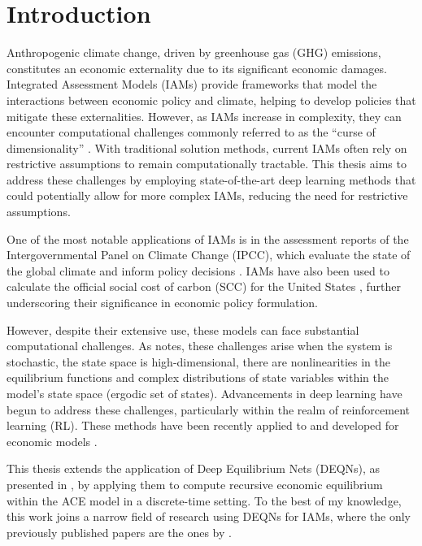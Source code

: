 \section{Introduction}

Anthropogenic climate change, driven by greenhouse gas (GHG) emissions, constitutes an economic externality due to its significant economic damages.
Integrated Assessment Models (IAMs) provide frameworks that model the interactions between economic policy and climate, helping to develop policies that mitigate these externalities. However, as IAMs increase in complexity, they can encounter computational challenges commonly referred to as the \enquote{curse of dimensionality} \parencite{Bellman1961}. With traditional solution methods, current IAMs often rely on restrictive assumptions to remain computationally tractable. This thesis aims to address these challenges by employing state-of-the-art deep learning methods that could potentially allow for more complex IAMs, reducing the need for restrictive assumptions.

One of the most notable applications of IAMs is in the assessment reports of the Intergovernmental Panel on Climate Change (IPCC), which evaluate the state of the global climate and inform policy decisions \parencite{IPCC2023}. IAMs have also been used to calculate the official social cost of carbon (SCC) for the United States \parencite{IWGSCC2013}, further underscoring their significance in economic policy formulation. 

However, despite their extensive use, these models can face substantial computational challenges. As \textcite{Azinovic2022DEQN} notes, these challenges arise when the system is stochastic, the state space is high-dimensional, there are nonlinearities in the equilibrium functions and complex distributions of state variables within the model's state space (ergodic set of states). Advancements in deep learning have begun to address these challenges, particularly within the realm of reinforcement learning (RL). These methods have been recently applied to and developed for economic models \parencite{Maliar2021, Azinovic2022DEQN, Valaitis2024}.

This thesis extends the application of Deep Equilibrium Nets (DEQNs), as presented in \textcite{Azinovic2022DEQN}, by applying them to compute recursive economic equilibrium within the ACE model in a discrete-time setting. To the best of my knowledge, this work joins a narrow field of research using DEQNs for IAMs, where the only previously published papers are the ones by \textcite{Folini2024ClimateInCE, friedl2023_deepUQ}. 


